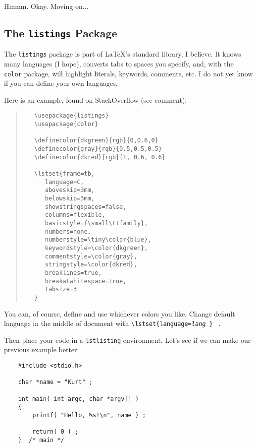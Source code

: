 Hmmm.  Okay.  Moving on...


\subsection{ The \texttt{listings} Package }
\label{ listingspkg }

The \texttt{listings} package is part of \LaTeX{}'s standard library, I
believe.  It knows many languages (I hope), converts tabs to spaces you specify,
and, with the \texttt{color} package, will highlight literals, keywords,
comments, etc.  I do not yet know if you can define your own languages.

Here is an example, found on StackOverflow (see comment):


\begin{quote}
	\begin{verbatim}
   \usepackage{listings}
   \usepackage{color}

   \definecolor{dkgreen}{rgb}{0,0.6,0}
   \definecolor{gray}{rgb}{0.5,0.5,0.5}
   \definecolor{dkred}{rgb}{1, 0.6, 0.6}

   \lstset{frame=tb,
      language=C,
      aboveskip=3mm,
      belowskip=3mm,
      showstringspaces=false,
      columns=flexible,
      basicstyle={\small\ttfamily},
      numbers=none,
      numberstyle=\tiny\color{blue},
      keywordstyle=\color{dkgreen},
      commentstyle=\color{gray},
      stringstyle=\color{dkred},
      breaklines=true,
      breakatwhitespace=true,
      tabsize=3
   }
	\end{verbatim}
\end{quote}

You can, of course, define and use whichever colors you like.  Change default
language in the middle of document with
\texttt{\textbackslash{}lstset\{language=\textit{lang} \} } .

Then place your code in a \texttt{lstlisting} environment.  Let's see if we can
make our previous example better:


\begin{lstlisting}
	#include <stdio.h>

	char *name = "Kurt" ;

	int main( int argc, char *argv[] )
	{
		printf( "Hello, %s!\n", name ) ;

		return( 0 ) ;
	}  /* main */
\end{lstlisting}

